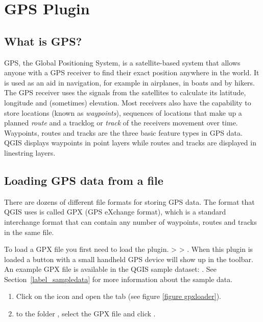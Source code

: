 
\section{GPS Plugin}\label{label_plugingps}


\subsection{What is GPS?}\label{whatsgps}

GPS, the Global Positioning System, is a satellite-based system that allows anyone with a GPS receiver to find their exact position anywhere in the world.
It is used as an aid in navigation, for example in airplanes, in boats and by hikers.
The GPS receiver uses the signals from the satellites to calculate its latitude, longitude and (sometimes) elevation.
Most receivers also have the capability to store locations (known as \emph{waypoints}), sequences of locations that make up a planned \emph{route} and a tracklog or \emph{track} of the receivers movement over time.
Waypoints, routes and tracks are the three basic feature types in GPS data.
QGIS displays waypoints in point layers while routes and tracks are displayed in linestring layers.

\subsection{Loading GPS data from a file}\label{label_loadgps}

There are dozens of different file formats for storing GPS data.
The format that QGIS uses is called GPX (GPS eXchange format), which is a standard interchange format that can contain any number of waypoints, routes and tracks in the same file.

To load a GPX file you first need to load the plugin.
 >  > . When this plugin is loaded a button with a 
small handheld GPS device will show up in the toolbar. An example GPX file is 
available in the QGIS sample dataset:
. See
Section~\ref{label_sampledata} for more information about the sample data.

\begin{enumerate}
\item Click on the  icon and open the
 tab (see figure \ref{figure gpxloader}).
\item {} to the folder ,
select the GPX file  and click .
\end{enumerate}

